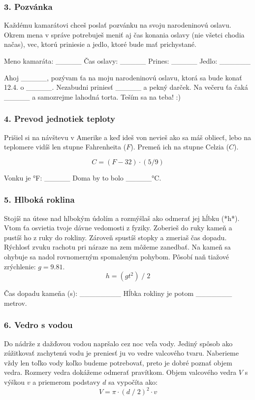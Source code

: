 \subsubsection*{3. Pozvánka}
Každému kamarátovi chceš poslať pozvánku na svoju narodeninovú oslavu. Okrem mena v správe potrebuješ meniť aj čas konania oslavy (nie všetci chodia načas), vec, ktorú priniesie a jedlo, ktoré bude mať prichystané.

\begin{code}
Meno kamaráta: _____
Čas oslavy: _____
Prines: _____
Jedlo: ______

Ahoj _____,
pozývam ťa na moju narodeninovú oslavu, ktorá sa bude konať 12.4. o _____. Nezabudni priniesť _____ a pekný darček. Na večeru ťa čaká _____ a samozrejme lahodná torta. Teším sa na teba! :)
\end{code}

\subsubsection*{4. Prevod jednotiek teploty}
Prišiel si na návštevu v Amerike a keď ideš von nevieš ako sa máš obliecť, lebo na teplomere vidíš len stupne Fahrenheita ($F$). Premeň ich na stupne Celzia ($C$).

$$ C = (F - 32) \cdot (5 / 9) $$

\begin{code}
Vonku je °F: _____
Doma by to bolo _____°C.
\end{code}

\subsubsection*{5. Hlboká roklina}
Stojíš na útese nad hlbokým údolím a rozmýšlaš ako odmerať jej hĺbku (*h*). Vtom ťa osvietia tvoje dávne vedomosti z fyziky. Zoberieš do ruky kameň a pustíš ho z ruky do rokliny.
Zároveň spustíš stopky a zmeriaš čas dopadu. Rýchlosť zvuku rachotu pri náraze na zem môžeme zanedbať. Na kameň sa ohybuje sa nadol rovnomerným spomaleným pohybom. Pôsobí naň tiažové zrýchlenie: $g = 9.81$.
$$ h = (gt^2)\;/\; 2 $$

\begin{code}
Čas dopadu kameňa (s): ________
Hĺbka rokliny je potom _______ metrov.
\end{code}

\subsubsection*{6. Vedro s vodou}
Do nádrže z dažďovou vodou napršalo cez noc veľa vody. Jediný spôsob ako zúžitkovať zachytenú vodu je preniesť ju vo vedre valcového tvaru. Naberieme vždy len toľko vody koľko budeme potrebovať, preto je dobré poznať objem vedra. Rozmery vedra dokážeme odmerať pravítkom. Objem valcového vedra $V$ s výškou $v$ a priemerom podstavy $d$ sa vypočíta ako:
$$ V = \pi \cdot (d\;/\;2)^2 \cdot v $$

